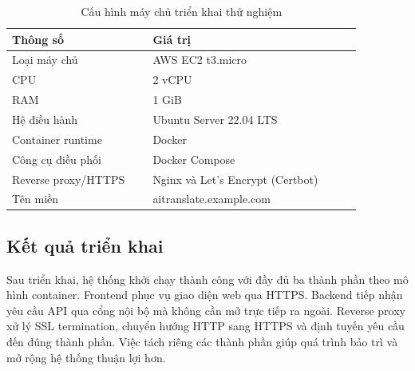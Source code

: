 ﻿\documentclass[../DoAn.tex]{subfiles}
\begin{document}
\begin{table}[htbp]
\centering
\caption{Cấu hình máy chủ triển khai thử nghiệm}
\label{table:server-config}
\small
\setlength{\tabcolsep}{4pt}
\renewcommand{\arraystretch}{1.16}
\begin{tabular}{|p{0.35\linewidth}|p{0.52\linewidth}|}
\hline
\textbf{Thông số} & \textbf{Giá trị} \\ \hline
Loại máy chủ & AWS EC2 t3.micro \\ \hline
CPU & 2 vCPU \\ \hline
RAM & 1 GiB \\ \hline
Hệ điều hành & Ubuntu Server 22.04 LTS \\ \hline
Container runtime & Docker \\ \hline
Công cụ điều phối & Docker Compose \\ \hline
Reverse proxy/HTTPS & Nginx và Let's Encrypt (Certbot) \\ \hline
Tên miền & aitranslate.example.com \\ \hline
\end{tabular}
\end{table}

\subsection{Kết quả triển khai}

Sau triển khai, hệ thống khởi chạy thành công với đầy đủ ba thành phần theo mô hình container. Frontend phục vụ giao diện web qua HTTPS. Backend tiếp nhận yêu cầu API qua cổng nội bộ mà không cần mở trực tiếp ra ngoài. Reverse proxy xử lý SSL termination, chuyển hướng HTTP sang HTTPS và định tuyến yêu cầu đến đúng thành phần. Việc tách riêng các thành phần giúp quá trình bảo trì và mở rộng hệ thống thuận lợi hơn.
\end{document}
